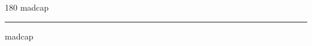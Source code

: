 
\begin{frame}
\begin{center}
\begin{turn}{180}
{\fontsize{2.5cm}{1em}\selectfont madcap}
\end{turn}
\vspace{1em}\par  
\hrule
\vspace{1em}\par  
{\fontsize{2.5cm}{1em}\selectfont madcap}
\end{center}
\end{frame}
